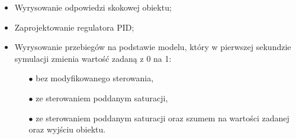 \begin{itemize}
	\item Wyrysowanie odpowiedzi skokowej obiektu;
	\item Zaprojektowanie regulatora PID;
	\item Wyrysowanie przebiegów na podstawie modelu, który w pierwszej sekundzie symulacji zmienia wartość zadaną z 0 na 1:
	\begin{itemize}
		\item[$\bullet$] bez modyfikowanego sterowania,
		\item[$\bullet$] ze sterowaniem poddanym saturacji,
		\item[$\bullet$] ze sterowaniem poddanym saturacji oraz szumem na wartości zadanej oraz wyjściu obiektu.
	\end{itemize}
\end{itemize}

